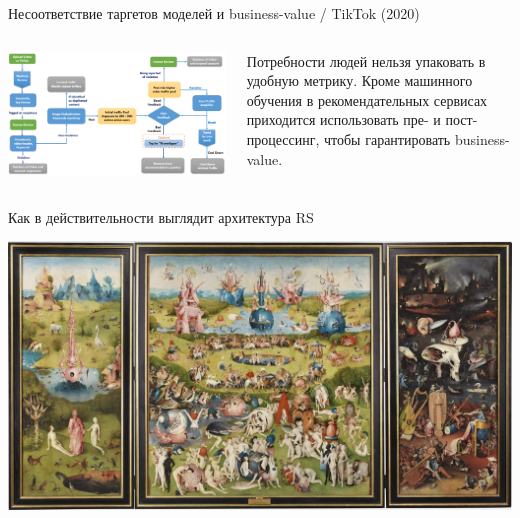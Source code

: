 \documentclass[11pt,aspectratio=169,handout]{beamer}
\begin{document}
\begin{frame}{Несоответствие таргетов моделей и business-value / TikTok (2020) \cite{TIK}}
\begin{columns}
\begin{column}{0.6\textwidth}
   \begin{center}
		\includegraphics[scale=0.24]{images/tiktok.png}
   \end{center}
\end{column}
\begin{column}{0.35\textwidth}
    \begin{small}
    \begin{tcolorbox}[colback=info!5,colframe=info!80,title=]
    Потребности людей нельзя упаковать в удобную метрику. Кроме машинного обучения  в рекомендательных сервисах приходится использовать пре- и пост-процессинг, чтобы гарантировать business-value.
    \end{tcolorbox}
    \end{small}
\end{column}
\end{columns}

\end{frame}

\begin{frame}{Как в действительности выглядит архитектура RS}

\begin{center}
\includegraphics[scale=0.15]{images/bosch.jpeg}
\end{center}

\end{frame}
\end{document}
